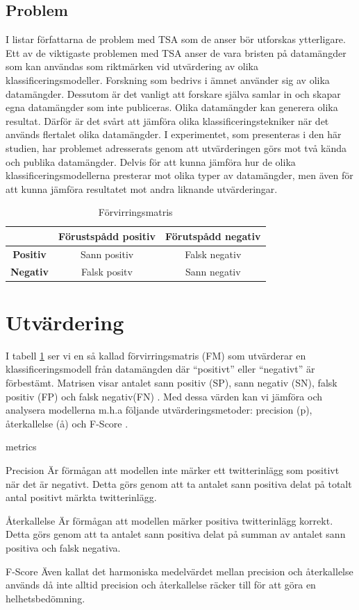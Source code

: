 \documentclass{kaumasters} %
\begin{document}
\subsection{Problem} \label{TSAprob}
I \cite{TSAsurvey} listar författarna de problem med TSA som de anser bör utforskas ytterligare. Ett av de viktigaste problemen med TSA anser de vara bristen på datamängder som kan användas som riktmärken vid utvärdering av olika klassificeringsmodeller. Forskning som bedrivs i ämnet använder sig av olika datamängder. Dessutom är det vanligt att forskare själva samlar in och skapar egna datamängder som inte publiceras. Olika datamängder kan generera olika resultat. Därför är det svårt att jämföra olika klassificeringstekniker när det används flertalet olika datamängder. I experimentet, som presenteras i den här studien, har problemet adresserats genom att utvärderingen görs mot två kända och publika datamängder. Delvis för att kunna jämföra hur de olika klassificeringsmodellerna presterar mot olika typer av datamängder, men även för att kunna jämföra resultatet mot andra liknande utvärderingar.
\begin{table}
\centering
\caption{Förvirringsmatris}
\label{tab:fm}
	\begin{tabular}{ccc}
	\toprule
	 & \textbf{Förustspådd positiv} & \textbf{Förutspådd negativ} \\
	\midrule
	\textbf{Positiv} & Sann positiv & Falsk negativ \\
	\textbf{Negativ} & Falsk positv & Sann negativ \\
	\bottomrule
\end{tabular}
\end{table}

\section{Utvärdering} \label{TSAev}
I tabell \ref{tab:fm} ser vi en så kallad förvirringsmatris (FM) som utvärderar en klassificeringsmodell från datamängden där “positivt” eller “negativt” är förbestämt. Matrisen visar antalet sann positiv (SP), sann negativ (SN), falsk positiv (FP) och falsk negativ(FN) \cite{wiki:003}. Med dessa värden kan vi jämföra och analysera modellerna m.h.a följande utvärderingsmetoder: precision (p), återkallelse (å) \cite{wiki:002} och F-Score \cite{wiki:001}.

\begin{labeling}{metrics}
\item [Precision] Är förmågan att modellen inte märker ett twitterinlägg som positivt när det är negativt. Detta görs genom att ta antalet sann positiva delat på totalt antal positivt märkta twitterinlägg. 
\item [Återkallelse] Är förmågan att modellen märker positiva twitterinlägg korrekt. Detta görs genom att ta antalet sann positiva delat på summan av antalet sann positiva och falsk negativa.
\item [F-Score] Även kallat det harmoniska medelvärdet mellan precision och återkallelse används då inte alltid precision och återkallelse räcker till för att göra en helhetsbedömning. 
\end{labeling}
\end{document}
